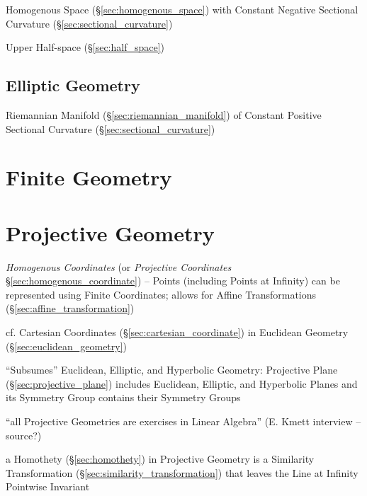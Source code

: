 Homogenous Space (\S\ref{sec:homogenous_space}) with Constant Negative
Sectional Curvature (\S\ref{sec:sectional_curvature})

Upper Half-space (\S\ref{sec:half_space})



\subsection{Elliptic Geometry}\label{sec:elliptic_geometry}

Riemannian Manifold (\S\ref{sec:riemannian_manifold}) of Constant Positive
Sectional Curvature (\S\ref{sec:sectional_curvature})



\section{Finite Geometry}\label{sec:finite_geometry}

\section{Projective Geometry}\label{sec:projective_geometry}

\emph{Homogenous Coordinates} (or \emph{Projective Coordinates}
\S\ref{sec:homogenous_coordinate}) -- Points (including Points at Infinity) can
be represented using Finite Coordinates; allows for Affine Transformations
(\S\ref{sec:affine_transformation})

cf. Cartesian Coordinates (\S\ref{sec:cartesian_coordinate}) in
Euclidean Geometry (\S\ref{sec:euclidean_geometry})

``Subsumes'' Euclidean, Elliptic, and Hyperbolic Geometry: Projective
Plane (\S\ref{sec:projective_plane}) includes Euclidean, Elliptic, and
Hyperbolic Planes and its Symmetry Group contains their Symmetry
Groups

``all Projective Geometries are exercises in Linear Algebra'' (E.
Kmett interview -- source?) %

a Homothety (\S\ref{sec:homothety}) in Projective Geometry is a Similarity
Transformation (\S\ref{sec:similarity_transformation}) that leaves the Line at
Infinity Pointwise Invariant



